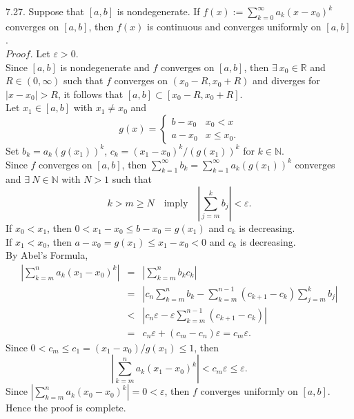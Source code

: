 \documentclass[12pt]{book}
\begin{document}
\begin{CJK}{UTF8}{bsmi}
7.27. Suppose that $[a, b]$ is nondegenerate. If $f(x) := \sum_{k=0}^\infty a_k(x-x_0)^k$ converges on $[a, b]$, then $f(x)$ is continuous and converges uniformly on $[a, b]$. \\
$Proof$. Let $\varepsilon>0$. \\
Since $[a, b]$ is nondegenerate and $f$ converges on $[a, b]$, then $\exists\ x_0\in\mathbb{R}$ and $R\in(0, \infty)$ such that $f$ converges on $(x_0-R, x_0+R)$ and diverges for $|x-x_0|>R$, it follows that $[a, b]\subset[x_0-R, x_0+R]$. \\
Let $x_1\in[a, b]$ with $x_1\ne x_0$ and
\[
    g(x) = \left\{\begin{matrix}
  b - x_0 & x_0 < x \\
  a - x_0 & x \le x_0.
\end{matrix}\right.
\]
Set $b_k = a_k(g(x_1))^k$, $c_k = (x_1-x_0)^k/(g(x_1))^k$ for $k\in\mathbb{N}$. \\
Since $f$ converges on $[a, b]$, then $\sum_{k=1}^\infty b_k = \sum_{k=1}^\infty a_k(g(x_1))^k$ converges and $\exists\ N\in\mathbb{N}$ with $N>1$ such that 
\[
    k>m\ge N\quad\text{imply}\quad
    \left| \sum_{j=m}^k b_j \right|
    < \varepsilon.
\]
If $x_0 < x_1$, then $0 < x_1-x_0 \le b-x_0 = g(x_1)$ and $c_k$ is decreasing. \\
If $x_1 < x_0$, then $a-x_0 = g(x_1) \le x_1-x_0 < 0$ and $c_k$ is decreasing. \\
By Abel's Formula, 
\begin{eqnarray*}
\left| \sum_{k=m}^n a_k(x_1-x_0)^k \right| 
    & = & \left| \sum_{k=m}^n b_k c_k \right| \\
    & = & \left| c_n\sum_{k=m}^n b_k - \sum_{k=m}^{n-1} (c_{k+1}-c_k)\sum_{j=m}^k b_j \right| \\
    & < & \left| c_n\varepsilon - \varepsilon\sum_{k=m}^{n-1} (c_{k+1}-c_k) \right| \\
    & = & c_n\varepsilon + (c_m - c_n)\varepsilon = c_m\varepsilon.
\end{eqnarray*}
Since $0 < c_m \le c_1 = (x_1-x_0)/g(x_1) \le 1$, then 
\[
    \left| \sum_{k=m}^n a_k(x_1-x_0)^k \right| < c_m\varepsilon \le \varepsilon.
\]
Since $\left| \sum_{k=m}^n a_k(x_0-x_0)^k \right| = 0 < \varepsilon$, then $f$ converges uniformly on $[a, b]$. \\
Hence the proof is complete. \\

\end{CJK}
\end{document}
